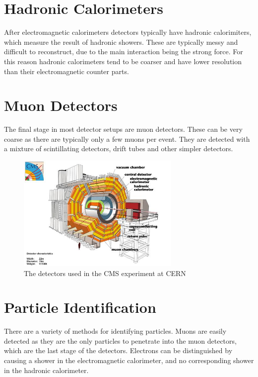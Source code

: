 \documentclass[fleqn]{NotesClass}
\begin{document}
    \section{Hadronic Calorimeters}
    After electromagnetic calorimeters detectors typically have hadronic calorimiters, which measure the result of hadronic showers.
    These are typically messy and difficult to reconstruct, due to the main interaction being the strong force.
    For this reason hadronic calorimeters tend to be coarser and have lower resolution than their electromagnetic counter parts.
    
    \section{Muon Detectors}
    The final stage in most detector setups are muon detectors.
    These can be very coarse as there are typically only a few muons per event.
    They are detected with a mixture of scintillating detectors, drift tubes and other simpler detectors.
    
    \begin{figure}
        \includegraphics[width=0.7\textwidth]{images/cern-cms-experiment.jpg}
        \caption{The detectors used in the CMS experiment at CERN \cite{cernCmsExperiment}}
    \end{figure}
    
    \section{Particle Identification}
    There are a variety of methods for identifying particles.
    Muons are easily detected as they are the only particles to penetrate into the muon detectors, which are the last stage of the detectors.
    Electrons can be distinguished by causing a shower in the electromagnetic calorimeter, and no corresponding shower in the hadronic calorimeter.
    
\end{document}
